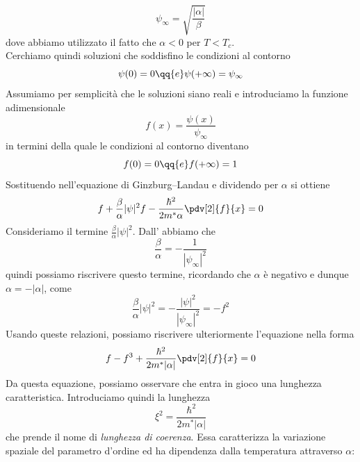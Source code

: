 \begin{equation}
   \psi_{\infty} = \sqrt{\frac{|\alpha|}{\beta}}
   \label{eq:psi_infinity}
\end{equation}
dove abbiamo utilizzato il fatto che $\alpha<0$ per $T<T_c$.\\
Cerchiamo quindi soluzioni che soddisfino le condizioni al contorno
\begin{equation*}
   \psi(0)=0
   \qq{e}
   \psi(+\infty)=\psi_{\infty}
\end{equation*}
Assumiamo per semplicità che le soluzioni siano reali e introduciamo la funzione adimensionale
\begin{equation*}
   f(x) = \frac{\psi(x)}{\psi_{\infty}}
\end{equation*}
in termini della quale le condizioni al contorno diventano
\begin{equation}
   f(0)=0
   \qq{e}
   f(+\infty)=1
   \label{eq:condizioni_al_contorno_f}
\end{equation}
Sostituendo nell'equazione di Ginzburg--Landau e dividendo per $\alpha$ si ottiene
\begin{equation*}
   f + \frac{\beta}{\alpha} |\psi|^2 f - \frac{\hbar^2}{2m^* \alpha} \pdv[2]{f}{x}=0
\end{equation*}
Consideriamo il termine $\frac{\beta}{\alpha}|\psi|^2$. Dall' abbiamo che 
\begin{equation*}
   \frac{\beta}{\alpha}=-\frac{1}{|\psi_\infty|^2}
\end{equation*}
quindi possiamo riscrivere questo termine, ricordando che $\alpha$ è negativo e dunque $\alpha=-|\alpha|$, come
\begin{equation*}
   \frac{\beta}{\alpha}|\psi|^2
   =-\frac{|\psi|^2}{|\psi_\infty|^2}
   =-f^2
\end{equation*}
Usando queste relazioni, possiamo riscrivere ulteriormente l'equazione nella forma
\begin{equation*}
   f - f^3 + \frac{\hbar^2}{2m^*|\alpha|} \pdv[2]{f}{x} = 0
\end{equation*}
Da questa equazione, possiamo osservare che entra in gioco una lunghezza caratteristica. Introduciamo quindi la lunghezza
\begin{equation*}
   \xi^2 = \frac{\hbar^2}{2m^* |\alpha|}
\end{equation*}
che prende il nome di \emph{lunghezza di coerenza}. Essa caratterizza la variazione spaziale del parametro d'ordine ed ha dipendenza dalla temperatura attraverso $\alpha$:
